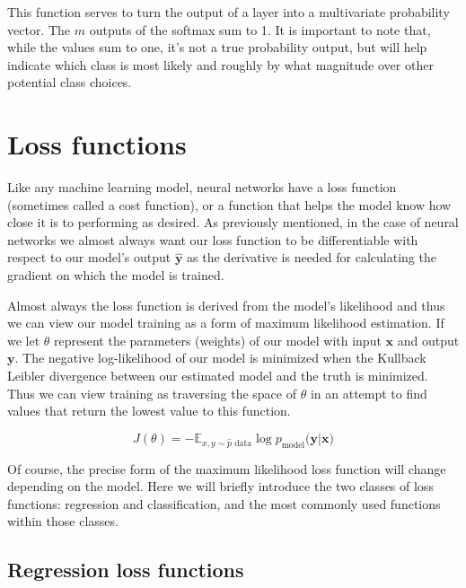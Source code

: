 \documentclass[]{book}
\theoremstyle{definition}
\theoremstyle{definition}
\theoremstyle{definition}
\theoremstyle{remark}
\let\BeginKnitrBlock\begin \let\EndKnitrBlock\end
\begin{document}
This function serves to turn the output of a layer into a multivariate
probability vector. The \(m\) outputs of the softmax sum to 1. It is
important to note that, while the values sum to one, it's not a true
probability output, but will help indicate which class is most likely
and roughly by what magnitude over other potential class choices.

\section{Loss functions}\label{loss-functions}

Like any machine learning model, neural networks have a loss function
(sometimes called a cost function), or a function that helps the model
know how close it is to performing as desired. As previously mentioned,
in the case of neural networks we almost always want our loss function
to be differentiable with respect to our model's output
\(\hat{\textbf{y}}\) as the derivative is needed for calculating the
gradient on which the model is trained.

Almost always the loss function is derived from the model's likelihood
and thus we can view our model training as a form of maximum likelihood
estimation. If we let \(\theta\) represent the parameters (weights) of
our model with input \(\textbf{x}\) and output \(\textbf{y}\). The
negative log-likelihood of our model is minimized when the Kullback
Leibler divergence between our estimated model and the truth is
minimized. Thus we can view training as traversing the space of
\(\theta\) in an attempt to find values that return the lowest value to
this function.

\BeginKnitrBlock{definition}[General maximum likelihood loss function]
\protect\hypertarget{def:negloglik}{}{\label{def:negloglik}
{}
}\[J(\theta) = - \mathbb{E}_{x,y \sim \hat{p} \text{ data}} \log{{p_{\text{model}}(\textbf{y} |\textbf{x} })}\]
\EndKnitrBlock{definition}

Of course, the precise form of the maximum likelihood loss function will
change depending on the model. Here we will briefly introduce the two
classes of loss functions: regression and classification, and the most
commonly used functions within those classes.

\subsection{Regression loss functions}\label{regression-loss-functions}
\end{document}

